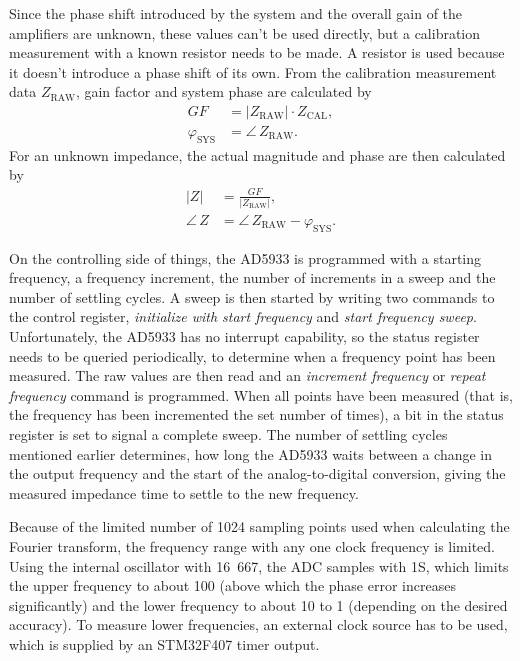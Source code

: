 Since the phase shift introduced by the system and the overall gain of the amplifiers are unknown, these values can't
be used directly, but a calibration measurement with a known resistor needs to be made. A resistor is used because
it doesn't introduce a phase shift of its own.
From the calibration measurement data $ Z_\text{RAW} $, gain factor and system phase are calculated by
\begin{align}
  GF &= \left| Z_\text{RAW} \right| \cdot Z_\text{CAL} , \\
  \varphi_\text{SYS} &= \angle\, Z_\text{RAW}.
\end{align}
For an unknown impedance, the actual magnitude and phase are then calculated by
\begin{align}
  \left| Z \right| &= \frac{GF}{\left| Z_\text{RAW} \right|} , \\
  \angle\, Z &= \angle\, Z_\text{RAW} - \varphi_\text{SYS}.
\end{align}

On the controlling side of things, the AD5933 is programmed with a starting frequency, a frequency increment, the
number of increments in a sweep and the number of settling cycles.
A sweep is then started by writing two commands to the control register, \emph{initialize with start frequency} and
\emph{start frequency sweep}. Unfortunately, the AD5933 has no interrupt capability, so the status register needs to
be queried periodically, to determine when a frequency point has been measured. The raw values are then read and an
\emph{increment frequency} or \emph{repeat frequency} command is programmed. When all points have been measured
(that is, the frequency has been incremented the set number of times), a bit in the status register is set to signal a
complete sweep.
The number of settling cycles mentioned earlier determines, how long the AD5933 waits between a change
in the output frequency and the start of the analog-to-digital conversion, giving the measured impedance time to
settle to the new frequency.

Because of the limited number of 1024 sampling points used when calculating the Fourier transform,
the frequency range with any one clock frequency is limited. Using the internal oscillator with
\unit{16.667}{\mega\hertz}, the ADC samples with \unit{1}{\mega{}S\per\second}, which limits the upper frequency to
about \unit{100}{\kilo\hertz} (above which the phase error increases significantly) and the lower frequency to about
\unit{10}{\kilo\hertz} to \unit{1}{\kilo\hertz} (depending on the desired accuracy).
To measure lower frequencies, an external clock source has to be used, which is supplied by an STM32F407 timer output.



